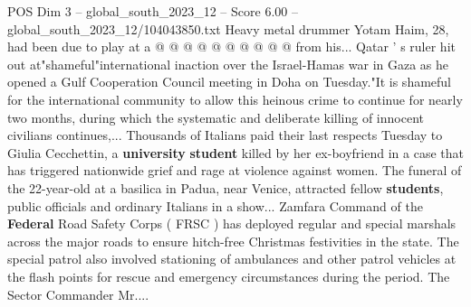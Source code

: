 \begin{textsample}{POS Dim 3 – global\_south\_2023\_12 – Score 6.00 – global\_south\_2023\_12/104043850.txt}
Heavy metal drummer Yotam Haim, 28, had been due to play at a @ @ @ @ @ @ @ @ @ @ from his...
Qatar ' s ruler hit out at"shameful"international inaction over the Israel-Hamas war in Gaza as he opened a Gulf Cooperation Council meeting in Doha on Tuesday."It is shameful for the international community to allow this heinous crime to continue for nearly two months, during which the systematic and deliberate killing of innocent civilians continues,...
Thousands of Italians paid their last respects Tuesday to Giulia Cecchettin, a \textbf{university} \textbf{student} killed by her ex-boyfriend in a case that has triggered nationwide grief and rage at violence against women.
The funeral of the 22-year-old at a basilica in Padua, near Venice, attracted fellow \textbf{students}, public officials and ordinary Italians in a show...
Zamfara Command of the \textbf{Federal} Road Safety Corps ( FRSC ) has deployed regular and special marshals across the major roads to ensure hitch-free Christmas festivities in the state.
The special patrol also involved stationing of ambulances and other patrol vehicles at the flash points for rescue and emergency circumstances during the period.
The Sector Commander Mr....

\end{textsample}
